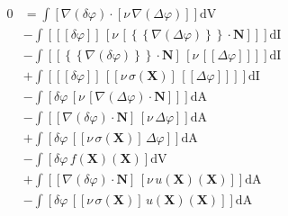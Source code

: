 \documentclass[preview,varwidth,multi,border=1pt]{standalone}
\begin{document}
\newpage

\preview
$\begin{aligned}
0 &= \int\left[\nabla\left(\delta{\varphi}\right) \cdot \left[{\nu}\,\nabla\left(\Delta{\varphi}\right)\right]\right]\textrm{dV} \\
  &- \int\left[\left[\!\left[\delta{\varphi}\right]\!\right]\,\left[{\nu}\,\left[\left\lbrace\!\left\lbrace\nabla\left(\Delta{\varphi}\right)\right\rbrace\!\right\rbrace \cdot \mathbf{N}\right]\right]\right]\textrm{dI} \\
  &- \int\left[\left[\left\lbrace\!\left\lbrace\nabla\left(\delta{\varphi}\right)\right\rbrace\!\right\rbrace \cdot \mathbf{N}\right]\,\left[{\nu}\,\left[\!\left[\Delta{\varphi}\right]\!\right]\right]\right]\textrm{dI} \\
  &+ \int\left[\left[\!\left[\delta{\varphi}\right]\!\right]\,\left[\left[{\nu}\,{\sigma\left(\mathbf{X}\right)}\right]\,\left[\!\left[\Delta{\varphi}\right]\!\right]\right]\right]\textrm{dI} \\
  &- \int\left[\delta{\varphi}\,\left[{\nu}\,\left[\nabla\left(\Delta{\varphi}\right) \cdot \mathbf{N}\right]\right]\right]\textrm{dA} \\
  &- \int\left[\left[\nabla\left(\delta{\varphi}\right) \cdot \mathbf{N}\right]\,\left[{\nu}\,\Delta{\varphi}\right]\right]\textrm{dA} \\
  &+ \int\left[\delta{\varphi}\,\left[\left[{\nu}\,{\sigma\left(\mathbf{X}\right)}\right]\,\Delta{\varphi}\right]\right]\textrm{dA} \\
  &- \int\left[\delta{\varphi}\,{f\left(\mathbf{X}\right)\left(\mathbf{X}\right)}\right]\textrm{dV} \\
  &+ \int\left[\left[\nabla\left(\delta{\varphi}\right) \cdot \mathbf{N}\right]\,\left[{\nu}\,{u\left(\mathbf{X}\right)\left(\mathbf{X}\right)}\right]\right]\textrm{dA} \\
  &- \int\left[\delta{\varphi}\,\left[\left[{\nu}\,{\sigma\left(\mathbf{X}\right)}\right]\,{u\left(\mathbf{X}\right)\left(\mathbf{X}\right)}\right]\right]\textrm{dA}
\end{aligned}$
\endpreview


%
\end{document}
